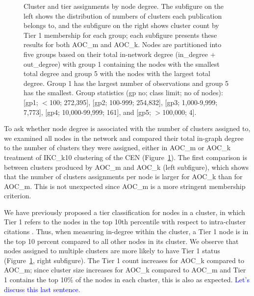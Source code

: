 \documentclass[12pt, oneside]{article}   	%
\begin{document}
\begin{figure}[H]
\begin{subfigure}[t]{0.48\textwidth}
    	\end{subfigure}
\captionsetup{width=0.9\textwidth}	
\caption{Cluster and tier assignments by node degree. The subfigure on the left shows the distribution of numbers of clusters each publication belongs to, and the subfigure on the right shows cluster count by Tier 1 membership for each group; each subfigure presents these results for both AOC\_m and AOC\_k. Nodes are partitioned into five groups based on their total in-network degree (in\_degree + out\_degree) with group 1 containing the nodes with the smallest total degree and group 5 with the nodes with the largest total degree. Group 1 has the largest number of observations and group 5 has the smallest. Group statistics (gp no; class limit; no of nodes): [gp1; $<$100;  272,395], [gp2; 100-999; 254,832], [gp3; 1,000-9,999; 7,773], [gp4; 10,000-99,999; 161], and [gp5; $>$100,000; 4]. }
\label{fig:fig3}
\end{figure}


To ask whether node degree is associated with the number of clusters assigned to, we examined all nodes in the network and compared their total in-graph degree to the number of clusters they were assigned, either in AOC\_m or AOC\_k treatment of IKC\_k10 clustering of the CEN (Figure~\ref{fig:fig3}). The first comparison is between clusters produced by AOC\_m and AOC\_k (left subfigure), which shows that the number of clusters assignments per node is larger for AOC\_k than for AOC\_m. This is not unexpected since AOC\_m is a more stringent membership criterion. 

We have previously proposed a tier classification for nodes in a cluster, in which Tier 1 refers to the nodes in the top 10th percentile with respect to intra-cluster citations \citep{Chandrasekharan2021}. Thus, when measuring in-degree within the cluster, a Tier 1 node is in the top 10 percent compared to all other nodes in its cluster. We observe that nodes assigned to multiple clusters are more likely to have Tier 1 status (Figure~\ref{fig:fig3}, right subfigure). The Tier 1 count increases for AOC\_k compared to AOC\_m; since cluster size  increases for AOC\_k compared to AOC\_m and Tier 1 contains the top 10\% of the nodes in each cluster, this is also as expected. \textcolor{blue}{Let's discuss this last sentence.}
\end{document}
